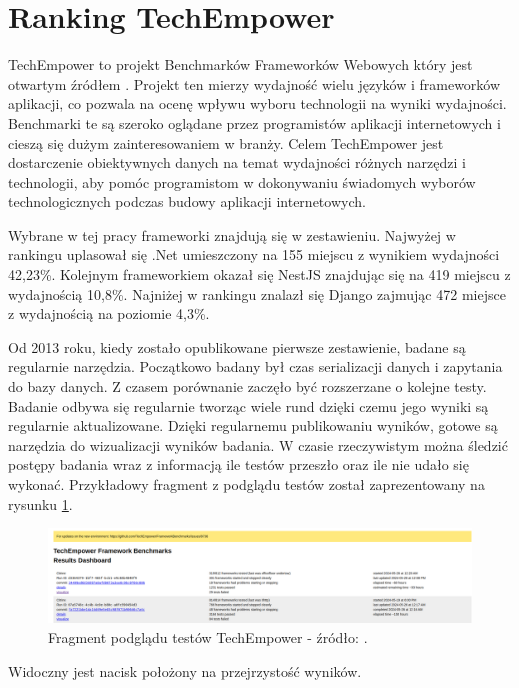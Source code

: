 \section{Ranking TechEmpower}

TechEmpower to projekt Benchmarków Frameworków Webowych który jest otwartym źródłem \cite{techempower}.
Projekt ten mierzy wydajność wielu języków i frameworków aplikacji, co pozwala na ocenę wpływu wyboru technologii na wyniki wydajności.
Benchmarki te są szeroko oglądane przez programistów aplikacji internetowych i cieszą się dużym zainteresowaniem w branży.
Celem TechEmpower jest dostarczenie obiektywnych danych na temat wydajności różnych narzędzi i technologii, aby pomóc programistom w dokonywaniu świadomych wyborów technologicznych podczas budowy aplikacji internetowych.

Wybrane w tej pracy frameworki znajdują się w zestawieniu.
Najwyżej w rankingu uplasował się .Net umieszczony na 155 miejscu z wynikiem wydajności 42,23\%.
Kolejnym frameworkiem okazał się NestJS znajdując się na 419 miejscu z wydajnością 10,8\%.
Najniżej w rankingu znalazł się Django zajmując 472 miejsce z wydajnością na poziomie 4,3\%. 

Od 2013 roku, kiedy zostało opublikowane pierwsze zestawienie, badane są regularnie narzędzia.
Początkowo badany był czas serializacji danych i zapytania do bazy danych.
Z czasem porównanie zaczęło być rozszerzane o kolejne testy.
Badanie odbywa się regularnie tworząc wiele rund dzięki czemu jego wyniki są regularnie aktualizowane.
Dzięki regularnemu publikowaniu wyników, gotowe są narzędzia do wizualizacji wyników badania.
W czasie rzeczywistym można śledzić postępy badania wraz z informacją ile testów przeszło oraz ile nie udało się wykonać.
Przykładowy fragment z podglądu testów został zaprezentowany na rysunku \ref{rys:techempowerdashhboard}.

\begin{figure}[!hb]
	\centering \includegraphics[width=1\linewidth]{rysunki/techempower_result_daschboard.png}
	\caption{Fragment podglądu testów TechEmpower - źródło: \cite{techempower}.}
	\label{rys:techempowerdashhboard}
\end{figure}

Widoczny jest nacisk położony na przejrzystość wyników.